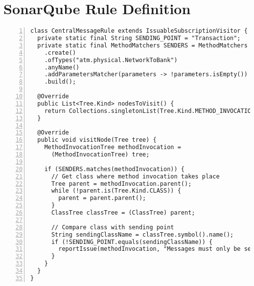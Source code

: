 \chapter{SonarQube Rule Definition}
\label{apx:sonarqube}

\begin{lstlisting}[caption={SonarQube custom rule that enforces constraint 3.}, captionpos=b, label=lst:sonarqube_rule, numbers=left, showstringspaces=false]
class CentralMessageRule extends IssuableSubscriptionVisitor {
  private static final String SENDING_POINT = "Transaction";
  private static final MethodMatchers SENDERS = MethodMatchers
    .create()
    .ofTypes("atm.physical.NetworkToBank")
    .anyName()
    .addParametersMatcher(parameters -> !parameters.isEmpty())
    .build();

  @Override
  public List<Tree.Kind> nodesToVisit() {
    return Collections.singletonList(Tree.Kind.METHOD_INVOCATION);
  }

  @Override
  public void visitNode(Tree tree) {
    MethodInvocationTree methodInvocation =
      (MethodInvocationTree) tree;

    if (SENDERS.matches(methodInvocation)) {
      // Get class where method invocation takes place
      Tree parent = methodInvocation.parent();
      while (!parent.is(Tree.Kind.CLASS)) {
        parent = parent.parent();
      }
      ClassTree classTree = (ClassTree) parent;

      // Compare class with sending point
      String sendingClassName = classTree.symbol().name();
      if (!SENDING_POINT.equals(sendingClassName)) {
        reportIssue(methodInvocation, "Messages must only be sent from the sending point");
      }
    }
  }
}
\end{lstlisting}